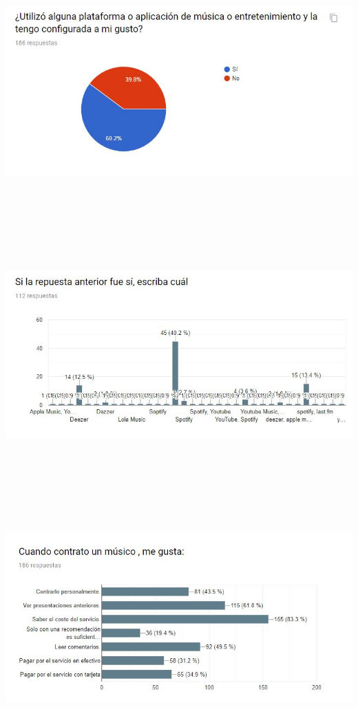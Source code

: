 \begin{center}
\includegraphics[width=16cm, height=10cm,keepaspectratio=true]{Desarrollo/RecoleccionInformacion/imgs/6.JPG}
\includegraphics[width=16cm, height=10cm,keepaspectratio=true]{Desarrollo/RecoleccionInformacion/imgs/7.JPG}
\includegraphics[width=16cm, height=10cm,keepaspectratio=true]{Desarrollo/RecoleccionInformacion/imgs/8.JPG}

\end{center}
